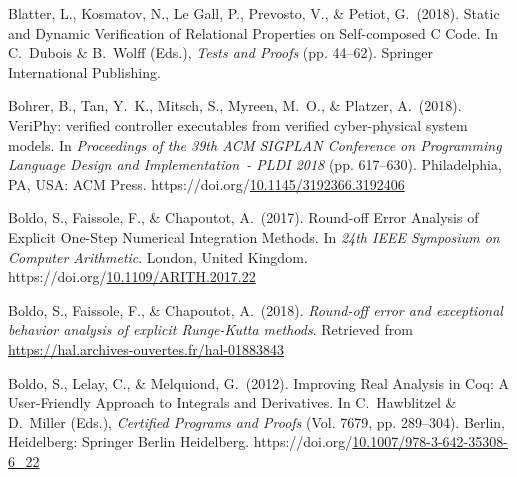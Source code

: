 \documentclass[12pt,twoside]{article}
\begin{document}
{\begin{thebibliography}{222}
Blatter, L., Kosmatov, N., Le Gall, P., Prevosto, V., \& Petiot, G.~(2018). Static and Dynamic Verification of Relational Properties on Self-composed C Code. In C.~Dubois \& B.~Wolff (Eds.), \emph{Tests and Proofs} (pp. 44–62). Springer International Publishing.\label{blatter_static_2018}%

Bohrer, B., Tan, Y.~K., Mitsch, S., Myreen, M.~O., \& Platzer, A.~(2018). VeriPhy: verified controller executables from verified cyber-physical system models. In \emph{Proceedings of the 39th ACM SIGPLAN Conference on Programming Language Design and Implementation~- PLDI 2018} (pp. 617–630). Philadelphia, PA, USA: ACM Press. https://doi.org/\href{https://dx.doi.org/10.1145/3192366.3192406}{10.1145/3192366.3192406}\label{bohrer_veriphy:_2018}%

Boldo, S., Faissole, F., \& Chapoutot, A.~(2017). Round-off Error Analysis of Explicit One-Step Numerical Integration Methods. In \emph{24th IEEE Symposium on Computer Arithmetic}. London, United Kingdom. https://doi.org/\href{https://dx.doi.org/10.1109/ARITH.2017.22}{10.1109/ARITH.2017.22}\label{boldo_round-off_2017}%

Boldo, S., Faissole, F., \& Chapoutot, A.~(2018). \emph{Round-off error and exceptional behavior analysis of explicit Runge-Kutta methods}. Retrieved from \href{https://hal.archives-ouvertes.fr/hal-01883843}{{\ttfamily https://\hspace{0pt}hal.\hspace{0pt}archives-\hspace{0pt}ouvertes.\hspace{0pt}fr/\hspace{0pt}hal-\hspace{0pt}01883843}}\label{boldo_round-off_2018}%

Boldo, S., Lelay, C., \& Melquiond, G.~(2012). Improving Real Analysis in Coq: A User-Friendly Approach to Integrals and Derivatives. In C.~Hawblitzel \& D.~Miller (Eds.), \emph{Certified Programs and Proofs} (Vol. 7679, pp. 289–304). Berlin, Heidelberg: Springer Berlin Heidelberg. https://doi.org/\href{https://dx.doi.org/10.1007/978-3-642-35308-6_22}{10.1007/978-3-642-35308-6\_22}\label{hutchison_improving_2012}%


\end{thebibliography}}
\end{document}
